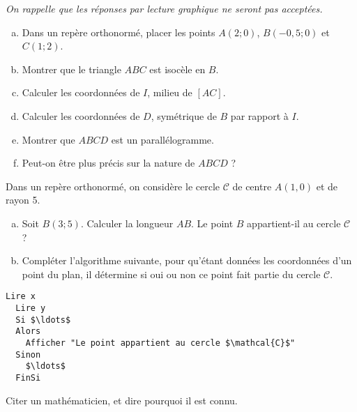 \documentclass[12pt]{article}
\begin{document}
\begin{exercice}
\emph{On rappelle que les réponses par lecture graphique ne seront pas acceptées.}
\begin{enumerate}[(a)]
  \item Dans un repère orthonormé, placer les points $A(2;0)$, $B(-0,5;0)$ et $C(1;2)$.
  \item Montrer que le triangle $ABC$ est isocèle en $B$.
  \item Calculer les coordonnées de $I$, milieu de $\left[AC\right]$.
  \item Calculer les coordonnées de $D$, symétrique de $B$ par rapport à $I$.
  \item Montrer que $ABCD$ est un parallélogramme.
  \item Peut-on être plus précis sur la nature de $ABCD$ ?
\end{enumerate}
\end{exercice}

\pagebreak

\begin{exercice}
  Dans un repère orthonormé, on considère le cercle $\mathcal{C}$ de centre $A(1, 0)$ et de rayon 5.
  \begin{enumerate}[(a)]
    \item Soit $B(3;5)$. Calculer la longueur $AB$. Le point $B$ appartient-il au cercle $\mathcal{C}$ ?
    \item Compléter l'algorithme suivante, pour qu'étant données les coordonnées d'un point du plan, il détermine si oui ou non ce point fait partie du cercle $\mathcal{C}$.
  \end{enumerate}

  \begin{lstlisting}[language=naturel,frame=lines,mathescape=true]
  Lire x
  Lire y
  Si $\ldots$
  Alors
    Afficher "Le point appartient au cercle $\mathcal{C}$"
  Sinon
    $\ldots$
  FinSi
  \end{lstlisting}

\end{exercice}

\begin{exercice}
Citer un mathématicien, et dire pourquoi il est connu.
\end{exercice}
\end{document}
